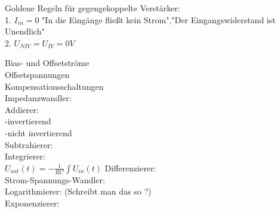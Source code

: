 \documentclass[A4]{scrartcl}
\begin{document}
  Goldene Regeln für gegengekoppelte Verstärker:\\
  1. $I_{in} = 0$ "In die Eingänge fließt kein Strom","Der Eingangswiderstand ist Unendlich"\\
  2. $U_{NIV} = U_{IV} = 0V$ 

  Bias- und Offsetströme\\
  Offsetspannungen\\
  Kompensationsschaltungen\\

  Impedanzwandler:\\
  Addierer:\\
   -invertierend\\
   -nicht invertierend\\
  Subtrahierer:\\
  Integrierer:\\
  $U_{out}(t) = -\frac{1}{RC} \int U_{in}(t)$
  Differenzierer:\\
  Strom-Spannungs-Wandler:\\
  Logarithmierer: (Schreibt man das so ?)\\
  Exponenzierer:\\
  
\end{document}
